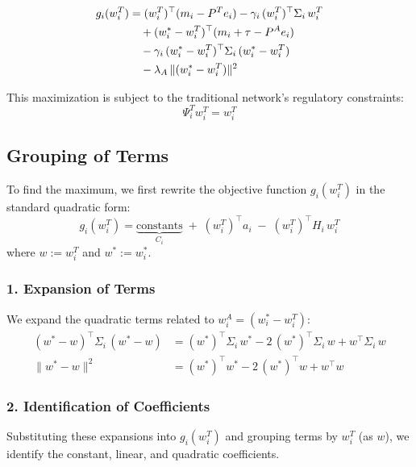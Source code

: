 \begin{align}\label{eq:app_ut_tot}
g_i(w_i^T)
&= (w_i^T)^\top (m_i - P^T e_i)
  - \gamma_i\,(w_i^T)^\top \Sigma_i\,w_i^T \notag\\
&\quad+ (w_i^* - w_i^T)^\top (m_i + \tau - P^A e_i) \notag\\
&\quad- \gamma_i\,(w_i^* - w_i^T)^\top \Sigma_i\,(w_i^* - w_i^T) \\
&\quad - \lambda_A\,\|(w_i^* - w_i^T)\|^2 \notag
\end{align}

This maximization is subject to the traditional network's regulatory constraints:
\begin{equation}
\Psi_i^T w_i^T = w_i^T
\end{equation}

\subsection{Grouping of Terms}
To find the maximum, we first rewrite the objective function $g_i(w_i^T)$ in the standard quadratic form:
\[
g_i(w_i^T)
= \underbrace{\text{constants}}_{C_i}
\;+\;(w_i^T)^\top a_i
\;-\;(w_i^T)^\top H_i\,w_i^T
\]
where \(w := w_i^T\) and \(w^* := w_i^*\).

\subsubsection{1. Expansion of Terms}
We expand the quadratic terms related to $w_i^A = (w_i^* - w_i^T)$:
\begin{align*}
(w^* - w)^\top \Sigma_i\,(w^* - w)
&= (w^*)^\top \Sigma_i\,w^*
  - 2\,(w^*)^\top \Sigma_i\,w
  + w^\top \Sigma_i\,w \\
\|w^* - w\|^2
&= (w^*)^\top w^*
  - 2\,(w^*)^\top w
  + w^\top w
\end{align*}

\subsubsection{2. Identification of Coefficients}
Substituting these expansions into $g_i(w_i^T)$ and grouping terms by $w_i^T$ (as $w$), we identify the constant, linear, and quadratic coefficients.

